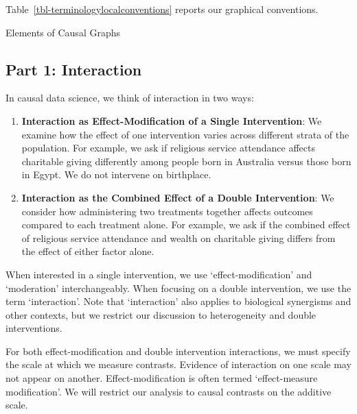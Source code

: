 \documentclass[
  single column]{article}
\begin{document}
Table~\ref{tbl-terminologylocalconventions} reports our graphical
conventions.

\begin{table}

\caption{\label{tbl-terminologygeneral}Elements of Causal Graphs}

\centering{

\terminologygeneral

}

\end{table}%

\newpage{}

\subsection{Part 1: Interaction}\label{part-1-interaction}

In causal data science, we think of interaction in two ways:

\begin{enumerate}
\def\labelenumi{\arabic{enumi}.}
\item
  \textbf{Interaction as Effect-Modification of a Single Intervention}:
  We examine how the effect of one intervention varies across different
  strata of the population. For example, we ask if religious service
  attendance affects charitable giving differently among people born in
  Australia versus those born in Egypt. We do not intervene on
  birthplace.
\item
  \textbf{Interaction as the Combined Effect of a Double Intervention}:
  We consider how administering two treatments together affects outcomes
  compared to each treatment alone. For example, we ask if the combined
  effect of religious service attendance and wealth on charitable giving
  differs from the effect of either factor alone.
\end{enumerate}

When interested in a single intervention, we use `effect-modification'
and `moderation' interchangeably. When focusing on a double
intervention, we use the term `interaction'. Note that `interaction'
also applies to biological synergisms and other contexts, but we
restrict our discussion to heterogeneity and double interventions.

For both effect-modification and double intervention interactions, we
must specify the scale at which we measure contrasts. Evidence of
interaction on one scale may not appear on another. Effect-modification
is often termed `effect-measure modification'. We will restrict our
analysis to causal contrasts on the additive scale.
\end{document}
